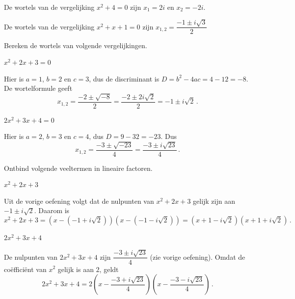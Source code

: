 \documentclass{ximera}
\begin{document}
    \begin{example} 
        \begin{question} De wortels van de vergelijking $x^2+4=0$ zijn $x_1=2i$ en $x_2=-2i$.\end{question}
        \begin{question} De wortels van de vergelijking $x^2+x+1=0$ zijn $x_{1,2}=\dfrac{-1\pm i\sqrt{3}}{2}$\end{question}
    \end{example}

    \begin{exercise} Bereken de wortels van volgende vergelijkingen.
        \begin{question} $x^2+2x+3=0$
        \begin{oplossing}\nl
            Hier is $a=1$, $b=2$ en $c=3$, dus de discriminant is $D=b^2-4ac=4-12=-8$.
            De wortelformule geeft
            $$
            x_{1,2}=\dfrac{-2\pm\sqrt{-8}}{2}=\dfrac{-2\pm 2i\sqrt{2}}{2}=-1\pm i\sqrt{2}\,.
            $$
        \end{oplossing}
        \end{question}
        \begin{question} $2x^2+3x+4=0$
        \begin{oplossing}\nl
            Hier is $a=2$, $b=3$ en $c=4$, dus $D=9-32=-23$.
            Dus
            $$
            x_{1,2}=\dfrac{-3\pm\sqrt{-23}}{4}=\dfrac{-3\pm i\sqrt{23}}{4}\,.
            $$
        \end{oplossing}
        \end{question}
    \end{exercise}

    \begin{exercise} Ontbind volgende veeltermen in lineaire factoren.
        \begin{question} $x^2+2x+3$
        \begin{oplossing}\nl
            Uit de vorige oefening volgt dat de nulpunten van $x^2+2x+3$ gelijk zijn aan $-1\pm i\sqrt{2}$.
            Daarom is
            $$
            x^2+2x+3=(x-(-1+i\sqrt{2}))(x-(-1-i\sqrt{2}))
            =(x+1-i\sqrt{2})(x+1+i\sqrt{2})\,.
            $$
        \end{oplossing}
        \end{question}
        \begin{question} $2x^2+3x+4$
        \begin{oplossing}\nl
            De nulpunten van $2x^2+3x+4$ zijn $\dfrac{-3\pm i\sqrt{23}}{4}$ (zie vorige oefening).
            Omdat de coëfficiënt van $x^2$ gelijk is aan $2$, geldt
            $$
            2x^2+3x+4
            =2\left(x-\dfrac{-3+i\sqrt{23}}{4}\right)\left(x-\dfrac{-3-i\sqrt{23}}{4}\right)\,.
            $$
        \end{oplossing}
        \end{question}
    \end{exercise}
\end{document}
